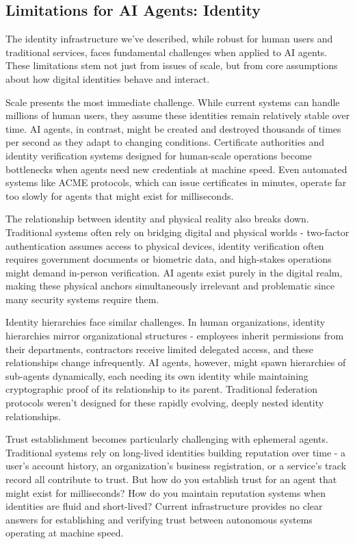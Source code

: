 \documentclass{article}
\begin{document}
\subsection{Limitations for AI Agents: Identity}
\label{subsec:identity_limitations}
The identity infrastructure we've described, while robust for human users and traditional services, faces fundamental challenges when applied to AI agents. These limitations stem not just from issues of scale, but from core assumptions about how digital identities behave and interact.

Scale presents the most immediate challenge. While current systems can handle millions of human users, they assume these identities remain relatively stable over time. AI agents, in contrast, might be created and destroyed thousands of times per second as they adapt to changing conditions. Certificate authorities and identity verification systems designed for human-scale operations become bottlenecks when agents need new credentials at machine speed. Even automated systems like ACME protocols, which can issue certificates in minutes, operate far too slowly for agents that might exist for milliseconds.

The relationship between identity and physical reality also breaks down. Traditional systems often rely on bridging digital and physical worlds - two-factor authentication assumes access to physical devices, identity verification often requires government documents or biometric data, and high-stakes operations might demand in-person verification. AI agents exist purely in the digital realm, making these physical anchors simultaneously irrelevant and problematic since many security systems require them.

Identity hierarchies face similar challenges. In human organizations, identity hierarchies mirror organizational structures - employees inherit permissions from their departments, contractors receive limited delegated access, and these relationships change infrequently. AI agents, however, might spawn hierarchies of sub-agents dynamically, each needing its own identity while maintaining cryptographic proof of its relationship to its parent. Traditional federation protocols weren't designed for these rapidly evolving, deeply nested identity relationships.

Trust establishment becomes particularly challenging with ephemeral agents. Traditional systems rely on long-lived identities building reputation over time - a user's account history, an organization's business registration, or a service's track record all contribute to trust. But how do you establish trust for an agent that might exist for milliseconds? How do you maintain reputation systems when identities are fluid and short-lived? Current infrastructure provides no clear answers for establishing and verifying trust between autonomous systems operating at machine speed.
\end{document}
